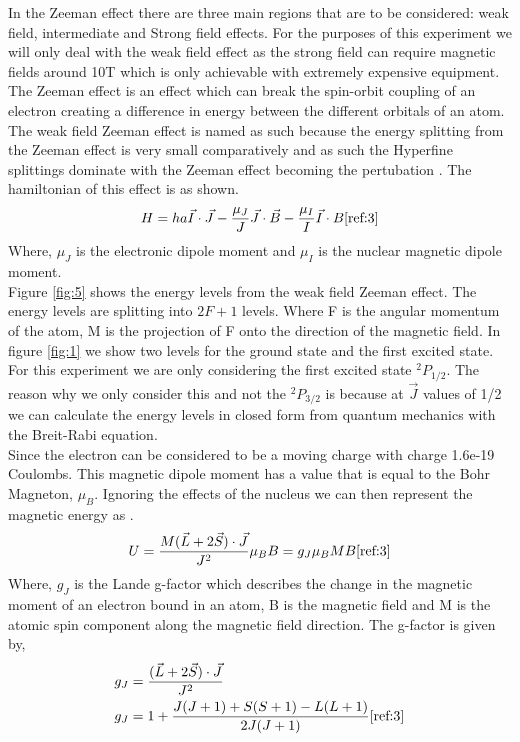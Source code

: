 \documentclass[twocolumn]{article}
\begin{document}
In the Zeeman effect there are three main regions that are to be considered: 
weak field, intermediate and Strong field effects. For the purposes of this 
experiment we will only deal with the weak field effect as the strong field 
can require magnetic fields around 10T which is only achievable with 
extremely expensive equipment.
\\
The Zeeman effect is an effect which can break the spin-orbit coupling of an 
electron creating a difference in energy between the different orbitals of an 
atom. The weak field Zeeman effect is named as such because the energy 
splitting from the Zeeman effect is very small comparatively and as such the 
Hyperfine splittings dominate with the Zeeman effect becoming the pertubation 
\cite{ref:4}. The hamiltonian of this effect is as shown.
\begin{equation}
H=ha\vec{I}\cdot\vec{J}-\frac{\mu_J}{J}\vec{J}\cdot\vec{B}-\frac{\mu_I}{I}\vec{I}\cdot{B}
\label{eqn:6}
\cite{ref:3}
\end{equation}
Where, $\mu_J$ is the electronic dipole moment and $\mu_I$ is the nuclear 
magnetic dipole moment.
\\
Figure \ref{fig:5} shows the energy levels from the weak field Zeeman effect. 
The energy levels are splitting into $2F+1$ levels. Where F is the angular 
momentum of the atom, M is the projection of F onto the direction of the 
magnetic field. In figure \ref{fig:1} we show two levels for the ground state 
and the first excited state. For this experiment we are only considering the 
first excited state $^2P_{1/2}$. The reason why we only consider this and not 
the $^2P_{3/2}$ is because at $\vec{J}$ values of 1/2 we can calculate the 
energy levels in closed form from quantum mechanics with the Breit-Rabi 
equation.
\\
Since the electron can be considered to be a moving charge with charge 1.6e-19 
Coulombs. This magnetic dipole moment has a value that is equal to the Bohr 
Magneton, $\mu_B$. Ignoring the effects of the nucleus we can then represent 
the magnetic energy as \cite{ref:3}.
\begin{equation}
U = \frac{M(\vec{L}+2\vec{S})\cdot\vec{J}}{J^2}\mu_B B = g_J\mu_B M B
\label{eqn:7}
\cite{ref:3}
\end{equation}
Where, $g_J$ is the Lande g-factor which describes the change in the magnetic 
moment of an electron bound in an atom, B is the magnetic field and M is the 
atomic spin component along the magnetic field direction. The g-factor is 
given by,
\begin{equation}
\begin{aligned}
g_J &= \frac{(\vec{L}+2\vec{S})\cdot\vec{J}}{J^2}
\\
g_J &= 1+\frac{J(J+1)+S(S+1)-L(L+1)}{2J(J+1)}
\label{eqn:8}
\cite{ref:3}
\end{aligned}
\end{equation}
\end{document}
